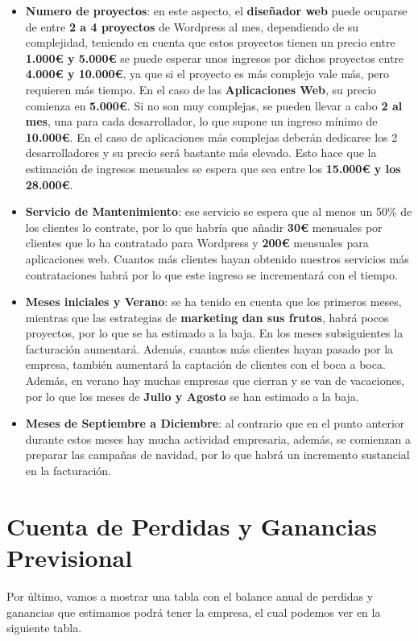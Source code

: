 \begin{itemize}
    \item \textbf{Numero de proyectos}: en este aspecto, el \textbf{diseñador web} puede ocuparse de entre \textbf{2 a 4 proyectos} de Wordpress al mes, dependiendo de su complejidad, teniendo en cuenta que estos proyectos tienen un precio entre \textbf{1.000€ y 5.000€} se puede esperar unos ingresos por dichos proyectos entre \textbf{4.000€ y 10.000€}, ya que si el proyecto es más complejo vale más, pero requieren más tiempo. En el caso de las \textbf{Aplicaciones Web}, su precio comienza en \textbf{5.000€}. Si no son muy complejas, se pueden llevar a cabo \textbf{2 al mes}, una para cada desarrollador, lo que supone un ingreso mínimo de \textbf{10.000€}. En el caso de aplicaciones más complejas deberán dedicarse los 2 desarrolladores y su precio será bastante más elevado. Esto hace que la estimación de ingresos mensuales se
    espera que sea entre los \textbf{15.000€ y los 28.000€}.

    \item \textbf{Servicio de Mantenimiento}: ese servicio se espera que al menos un 50\% de los clientes lo
    contrate, por lo que habría que añadir \textbf{30€} mensuales por clientes que lo ha contratado para Wordpress y \textbf{200€} mensuales para aplicaciones web. Cuantos más clientes hayan obtenido nuestros servicios más contrataciones habrá por lo que este ingreso se incrementará con el tiempo.

    \item \textbf{Meses iniciales y Verano}: se ha tenido en cuenta que los primeros meses, mientras que las estrategias de \textbf{marketing dan sus frutos}, habrá pocos proyectos, por lo que se ha estimado a la baja. En los meses subsiguientes la facturación aumentará. Además, cuantos más clientes hayan pasado por la empresa, también aumentará la captación de clientes con el boca a boca.  Además, en verano hay muchas empresas que cierran y se van de vacaciones, por lo que los meses de \textbf{Julio y Agosto} se han estimado a la baja.

    \item \textbf{Meses de Septiembre a Diciembre}: al contrario que en el punto anterior durante estos meses hay mucha actividad empresaria, además, se comienzan a preparar las campañas de navidad, por lo que habrá un incremento sustancial en la facturación.
\end{itemize}

\section{Cuenta de Perdidas y Ganancias Previsional}
Por último, vamos a mostrar una tabla con el balance anual de perdidas y ganancias que estimamos podrá tener la empresa, el cual podemos ver en la siguiente tabla.

